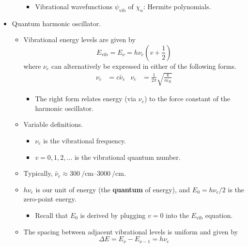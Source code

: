 \documentclass[../notes.tex]{subfiles}
\begin{document}
\begin{itemize}
\begin{itemize}
\begin{itemize}
            \item Vibrational wavefunctions $\psi_\text{vib}$ of $\chi_n$: Hermite polynomials.
        \end{itemize}
    \end{itemize}
    \item Quantum harmonic oscillator.
    \begin{itemize}
        \item Vibrational energy levels are given by
        \begin{equation*}
            E_\text{vib} = E_\nu
            = h\nu_e\left( v+\frac{1}{2} \right)
        \end{equation*}
        where $\nu_e$ can alternatively be expressed in either of the following forms.
        \begin{align*}
            \nu_e &= c\bar{\nu}_e&
            \nu_e &= \frac{1}{2\pi}\sqrt{\frac{k}{m_R}}
        \end{align*}
        \begin{itemize}
            \item The right form relates energy (via $\nu_e$) to the force constant of the harmonic oscillator.
        \end{itemize}
        \item Variable definitions.
        \begin{itemize}
            \item $\nu_e$ is the vibrational frequency.
            \item $v=0,1,2,\dots$ is the vibrational quantum number.
        \end{itemize}
        \item Typically, $\bar{\nu}_e\approx\SIrange{300}{3000}{\per\centi\meter}$.
        \item $h\nu_e$ is our unit of energy (the \textbf{quantum} of energy), and $E_0=h\nu_e/2$ is the zero-point energy.
        \begin{itemize}
            \item Recall that $E_0$ is derived by plugging $v=0$ into the $E_\text{vib}$ equation.
        \end{itemize}
        \item The spacing between adjacent vibrational levels is uniform and given by
        \begin{equation*}
            \Delta E = E_\nu-E_{\nu-1}
            = h\nu_e
        \end{equation*}
    \end{itemize}

\end{itemize}
\end{document}
